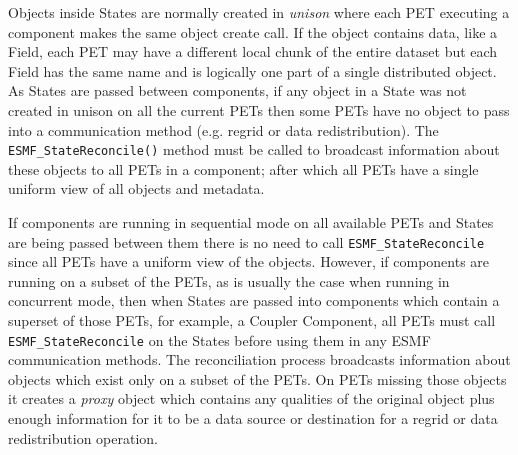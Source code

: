 Objects inside States are normally created in {\it unison} where
each PET executing a component makes the same object create call.
If the object contains data, like a Field, each PET may have a
different local chunk of the entire dataset but each Field has
the same name and is logically one part of a single distributed 
object.   As States are passed between components, if any object
in a State was not created in unison on all the current PETs 
then some PETs have no object to pass into a
communication method (e.g. regrid or data redistribution).
The {\tt ESMF\_StateReconcile()} method must be called to broadcast 
information about these objects to all PETs in a component;
after which all PETs have a single uniform view of all objects and metadata.  

If components are running in sequential mode on all available PETs
and States are being passed between them there is no need to call 
{\tt ESMF\_StateReconcile} since all PETs have a uniform view of the objects.
However, if components are running on a subset of the PETs, as is
usually the case when running in concurrent mode, then when States
are passed into components which contain a superset of those PETs,
for example, a Coupler Component, all PETs must call {\tt ESMF\_StateReconcile}
on the States before using them in any ESMF communication methods.
The reconciliation process broadcasts information about objects
which exist only on a subset of the PETs.  On PETs missing those
objects it creates a {\it proxy} object which contains any
qualities of the original object plus enough information for it
to be a data source or destination for a regrid or data redistribution
operation.
